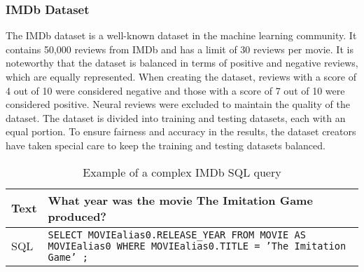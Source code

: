 \subsubsection{IMDb Dataset}

The IMDb dataset is a well-known dataset in the machine learning community. It contains 50,000 reviews from IMDb and has a limit of 30 reviews per movie\cite{maas-EtAl:2011:ACL-HLT2011}. It is noteworthy that the dataset is balanced in terms of positive and negative reviews, which are equally represented. When creating the dataset, reviews with a score of 4 out of 10 were considered negative and those with a score of 7 out of 10 were considered positive. Neural reviews were excluded to maintain the quality of the dataset. The dataset is divided into training and testing datasets, each with an equal portion. To ensure fairness and accuracy in the results, the dataset creators have taken special care to keep the training and testing datasets balanced.


\begin{table}[htbp]
    \centering
    \caption{Example of a complex IMDb SQL query}
    \label{tab:IMDBsqlquery}
    \begin{tabular}{|l|p{10cm}|}
        \hline
        Text & What year was the movie The Imitation Game produced?                                                                       \\ \hline
        SQL  & \small\texttt{SELECT MOVIEalias0.RELEASE\_YEAR FROM MOVIE AS MOVIEalias0 WHERE MOVIEalias0.TITLE = 'The Imitation Game' ;} \\ \hline
    \end{tabular}
\end{table}
